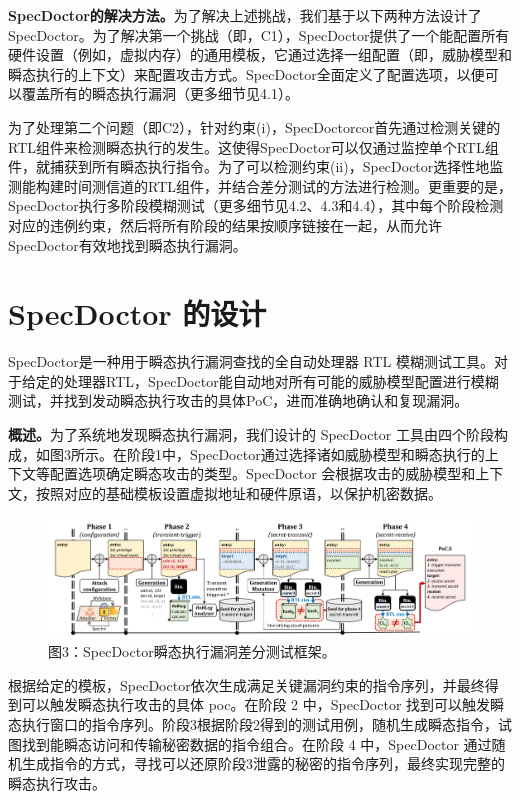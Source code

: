 \textbf{SpecDoctor的解决方法。}为了解决上述挑战，我们基于以下两种方法设计了SpecDoctor。为了解决第一个挑战（即，C1），SpecDoctor提供了一个能配置所有硬件设置（例如，虚拟内存）的通用模板，它通过选择一组配置（即，威胁模型和瞬态执行的上下文）来配置攻击方式。SpecDoctor全面定义了配置选项，以便可以覆盖所有的瞬态执行漏洞（更多细节见4.1）。\par

为了处理第二个问题（即C2），针对约束(i)，SpecDoctorcor首先通过检测关键的RTL组件来检测瞬态执行的发生。这使得SpecDoctor可以仅通过监控单个RTL组件，就捕获到所有瞬态执行指令。为了可以检测约束(ii)，SpecDoctor选择性地监测能构建时间测信道的RTL组件，并结合差分测试的方法进行检测。更重要的是，SpecDoctor执行多阶段模糊测试（更多细节见4.2、4.3和4.4），其中每个阶段检测对应的违例约束，然后将所有阶段的结果按顺序链接在一起，从而允许SpecDoctor有效地找到瞬态执行漏洞。\par

\section{SpecDoctor 的设计}
SpecDoctor是一种用于瞬态执行漏洞查找的全自动处理器 RTL 模糊测试工具。对于给定的处理器RTL，SpecDoctor能自动地对所有可能的威胁模型配置进行模糊测试，并找到发动瞬态执行攻击的具体PoC，进而准确地确认和复现漏洞。\par

\textbf{概述。}为了系统地发现瞬态执行漏洞，我们设计的 SpecDoctor 工具由四个阶段构成，如图3所示。在阶段1中，SpecDoctor通过选择诸如威胁模型和瞬态执行的上下文等配置选项确定瞬态攻击的类型。SpecDoctor 会根据攻击的威胁模型和上下文，按照对应的基础模板设置虚拟地址和硬件原语，以保护机密数据。\par

\begin{figure}[!h]
    \centering
    \includegraphics[width=\linewidth]{figure/proposal/specdoctor-figure3.png}
    \caption*{图3：SpecDoctor瞬态执行漏洞差分测试框架。}
\end{figure}

根据给定的模板，SpecDoctor依次生成满足关键漏洞约束的指令序列，并最终得到可以触发瞬态执行攻击的具体 poc。在阶段 2 中，SpecDoctor 找到可以触发瞬态执行窗口的指令序列。阶段3根据阶段2得到的测试用例，随机生成瞬态指令，试图找到能瞬态访问和传输秘密数据的指令组合。在阶段 4 中，SpecDoctor 通过随机生成指令的方式，寻找可以还原阶段3泄露的秘密的指令序列，最终实现完整的瞬态执行攻击。\par

